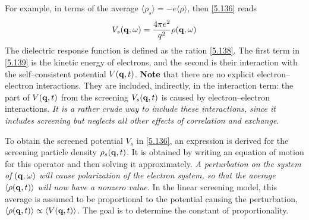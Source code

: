 For example, in terms of the average $\langle \rho_s \rangle = -e \langle \rho \rangle$, then \eqref{5.136} reads
\begin{equation}
    V_s (\mathbf{q},\omega) = \frac{4\pi e^2}{q^2} \rho(\mathbf{q},\omega)    \label{5.141}
\end{equation}
The dielectric response function is defined as the ration \eqref{5.138}.
The first term in \eqref{5.139} is the kinetic energy of electrons, and the second is their interaction with the self--consistent potential $V(\mathbf{q},t)$.
\textbf{Note} that there are no explicit electron--electron interactions.
They are included, indirectly, in the interaction term: the part of $V(\mathbf{q},t)$ from the screening $V_s(\mathbf{q},t)$ is caused by electron--electron interactions.
\textit{It is a rather crude way to include these interactions, since it includes screening but neglects all other effects of correlation and exchange}.

To obtain the screened potential $V_s$ in \eqref{5.136}, an expression is derived for the screening particle density $\rho_s(\mathbf{q},t)$.
It is obtained by writing an equation of motion for this operator and then solving it approximately.
\textit{A perturbation on the system of $(\mathbf{q},\omega)$ will cause polarization of the electron system, so that the average $\langle \rho(\mathbf{q},t) \rangle$ will now have a nonzero value.}
In the linear screening model, this average is assumed to be proportional to the potential causing the perturbation, $\langle \rho(\mathbf{q},t)\rangle \propto \langle V(\mathbf{q},t) \rangle$.
The goal is to determine the constant of proportionality.

